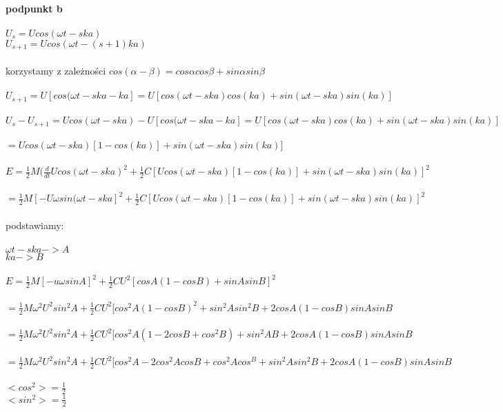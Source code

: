 \\
\\
\\
\textbf{podpunkt b}
\\
\\
$U_s=Ucos(\omega t-ska)$
\\
$U_{s+1}=Ucos(\omega t-(s+1)ka)$
\\
\\
korzystamy z zależności $cos(\alpha - \beta)=cos\alpha cos\beta+sin\alpha sin\beta$
\\
\\
$U_{s+1}=U[cos(\omega t- ska-ka]=U[cos(\omega t-ska)cos(ka)+sin(\omega t-ska)sin(ka)]$
\\
\\
$U_s-U_{s+1}=Ucos(\omega t-ska)-U[cos(\omega t- ska-ka]=U[cos(\omega t-ska)cos(ka)+sin(\omega t-ska)sin(ka)]$
\\
\\
$=Ucos(\omega t-ska)[1-cos(ka)]+sin(\omega t-ska)sin(ka)]$
\\
\\
$E=\frac{1}{2}M(\frac{d}{dt}Ucos(\omega t-ska)^2+\frac{1}{2}C[Ucos(\omega t-ska)[1-cos(ka)]+sin(\omega t-ska)sin(ka)]^2$
\\
\\
$=\frac{1}{2}M[-U\omega sin(\omega t-ska]^2+\frac{1}{2}C[Ucos(\omega t-ska)[1-cos(ka)]+sin(\omega t-ska)sin(ka)]^2$
\\
\\
podstawiamy:
\\
\\
$\omega t-ska -> A$
\\
$ka ->B$
\\
\\
$E=\frac{1}{2}M[-u\omega sinA]^2+\frac{1}{2}CU^2[cosA(1-cosB)+sinAsinB]^2$
\\
\\
$=\frac{1}{2}M\omega^2U^2sin^2A+\frac{1}{2}CU^2[cos^2A(1-cosB)^2+sin^2Asin^2B+2cosA(1-cosB)sinAsinB$
\\
\\
$=\frac{1}{2}M\omega^2U^2sin^2A+\frac{1}{2}CU^2[cos^2A(1-2cosB+cos^2B)+sin^2AB+2cosA(1-cosB)sinAsinB$
\\
\\
$=\frac{1}{2}M\omega^2U^2sin^2A+\frac{1}{2}CU^2[cos^2A-2cos^2AcosB+cos^2Acos^B+sin^2Asin^2B+2cosA(1-cosB)sinAsinB$
\\
\\
$<cos^2>=\frac{1}{2}$
\\
$<sin^2>=\frac{1}{2}$
\\
